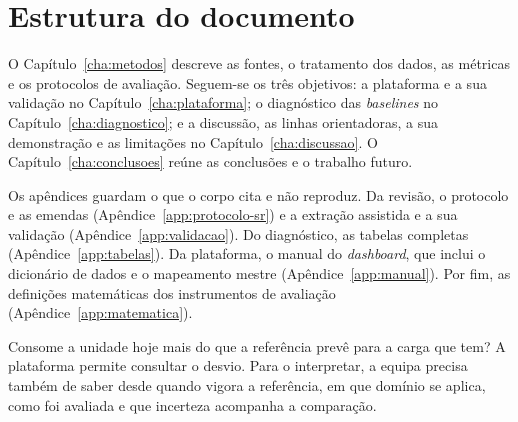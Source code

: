 \section{Estrutura do documento}
\label{sec:estrutura}

O Capítulo~\ref{cha:metodos} descreve as fontes, o tratamento dos dados,
as métricas e os protocolos de avaliação. Seguem-se os três objetivos:
a plataforma e a sua validação no Capítulo~\ref{cha:plataforma}; o
diagnóstico das \emph{baselines} no Capítulo~\ref{cha:diagnostico}; e a
discussão, as linhas orientadoras, a sua demonstração e as limitações no
Capítulo~\ref{cha:discussao}. O Capítulo~\ref{cha:conclusoes} reúne as
conclusões e o trabalho futuro.


Os apêndices guardam o que o corpo cita e não reproduz. Da revisão, o
protocolo e as emendas (Apêndice~\ref{app:protocolo-sr}) e a extração
assistida e a sua validação (Apêndice~\ref{app:validacao}). Do diagnóstico,
as tabelas completas (Apêndice~\ref{app:tabelas}). Da plataforma, o manual
do \emph{dashboard}, que inclui o dicionário de dados e o mapeamento mestre
(Apêndice~\ref{app:manual}). Por fim, as definições matemáticas dos
instrumentos de avaliação (Apêndice~\ref{app:matematica}).

Consome a unidade hoje mais do que a referência prevê para a carga
que tem? A plataforma permite consultar o desvio. Para o interpretar,
a equipa precisa também de saber desde quando vigora a referência,
em que domínio se aplica, como foi avaliada e que incerteza acompanha a
comparação. 
